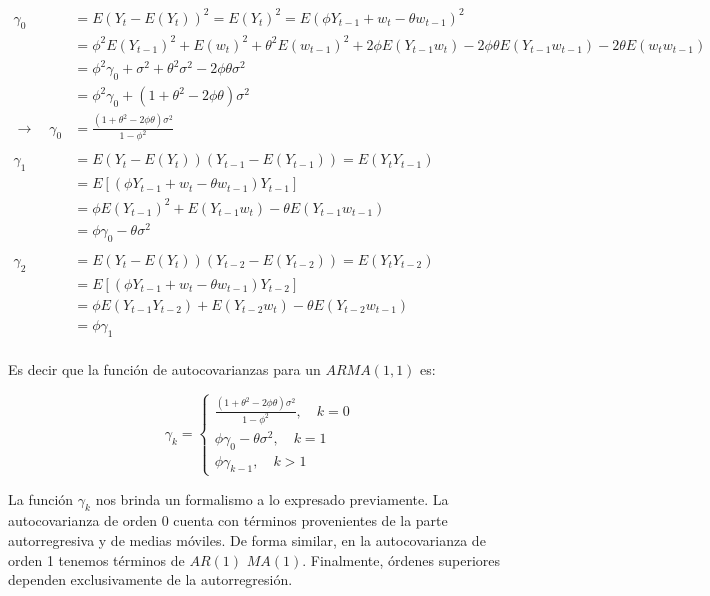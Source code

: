 \documentclass[a4paper,10pt]{article}
\begin{document}
\begin{equation*}
\begin{split}
\gamma_0 &= E(Y_t - E(Y_t))^2 = E(Y_t)^2 = E(\phi Y_{t-1} + w_t - \theta w_{t-1})^2 \\
&= \phi ^2 E(Y_{t-1})^2 + E(w_t)^2 + \theta^2 E(w_{t-1})^2 + 2\phi E(Y_{t-1}w_t) - 2\phi \theta E(Y_{t-1}w_{t-1}) - 2\theta E(w_t w_{t-1}) \\
&= \phi^2 \gamma_0 + \sigma^2 + \theta^2 \sigma^2 - 2\phi \theta \sigma^2 \\
&= \phi^2 \gamma_0 + (1+\theta^2 - 2\phi\theta) \sigma^2 \\
\to \quad \gamma_0 &= \frac{(1+\theta^2 -2\phi \theta)\sigma^2}{1-\phi^2}\\
\\ %
\gamma_1 &= E(Y_t - E(Y_t))(Y_{t-1} - E(Y_{t-1})) = E(Y_tY_{t-1}) \\
&= E[(\phi Y_{t-1} + w_t - \theta w_{t-1})Y_{t-1}] \\
&= \phi E(Y_{t-1})^2 +E(Y_{t-1}w_t) - \theta E(Y_{t-1} w_{t-1}) \\
&= \phi \gamma_0 - \theta \sigma^2 \\
\\ %
\gamma_2 &= E(Y_t - E(Y_t))(Y_{t-2} - E(Y_{t-2})) = E(Y_tY_{t-2}) \\
&= E[(\phi Y_{t-1} + w_t - \theta w_{t-1})Y_{t-2}] \\
&= \phi E(Y_{t-1}Y_{t-2}) +E(Y_{t-2}w_t) - \theta E(Y_{t-2} w_{t-1}) \\
&= \phi \gamma_1 \\
\end{split}
\end{equation*}

Es decir que la función de autocovarianzas para un $ARMA(1,1)$ es:

\begin{equation*}
\gamma_k= \left\{ \begin{array}{lcc}
             \frac{(1+\theta^2 -2\phi\theta) \sigma^2}{1-\phi^2} , \quad k=0 \\
             \phi \gamma_0 - \theta \sigma^2 , \quad k=1 \\
             \phi \gamma_{k-1} , \quad k>1
             \end{array}
   \right.
\end{equation*}


La función $\gamma_k$ nos brinda un formalismo a lo expresado previamente. La autocovarianza de orden 0 cuenta con términos provenientes de la parte autorregresiva y de medias móviles. De forma similar, en la autocovarianza de orden 1 tenemos términos de $AR(1)$ $MA(1)$. Finalmente, órdenes superiores dependen exclusivamente de la autorregresión.
\end{document}
